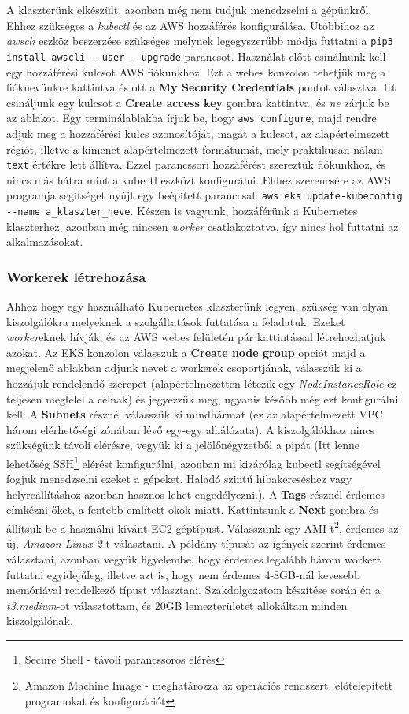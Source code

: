 A klaszterünk elkészült, azonban még nem tudjuk menedzselni a gépünkről. Ehhez szükséges a \textit{kubectl} és az AWS hozzáférés konfigurálása. Utóbbihoz az \textit{awscli} eszköz beszerzése szükséges melynek legegyszerűbb módja futtatni a \lstinline{pip3 install awscli --user --upgrade} parancsot. Használat előtt csinálnunk kell egy hozzáférési kulcsot AWS fiókunkhoz. Ezt a webes konzolon tehetjük meg a fióknevünkre kattintva és ott a \textbf{My Security Credentials} pontot választva. Itt csináljunk egy kulcsot a \textbf{Create access key} gombra kattintva, és \textit{ne} zárjuk be az ablakot. Egy terminálablakba írjuk be, hogy \lstinline{aws configure}, majd rendre adjuk meg a hozzáférési kulcs azonosítóját, magát a kulcsot, az alapértelmezett régiót, illetve a kimenet alapértelmezett formátumát, mely praktikusan nálam \lstinline{text} értékre lett állítva. Ezzel parancssori hozzáférést szereztük fiókunkhoz, és nincs más hátra mint a kubectl eszközt konfigurálni. Ehhez szerencsére az AWS programja segítséget nyújt egy beépített paranccsal: \lstinline{aws eks update-kubeconfig --name a_klaszter_neve}. Készen is vagyunk, hozzáférünk a Kubernetes klaszterhez, azonban még nincsen \textit{worker} csatlakoztatva, így nincs hol futtatni az alkalmazásokat.
\subsubsection{Workerek létrehozása}
Ahhoz hogy egy használható Kubernetes klaszterünk legyen, szükség van olyan kiszolgálókra melyeknek a szolgáltatások futtatása a feladatuk. Ezeket \textit{worker}eknek hívják, és az AWS webes felületén pár kattintással létrehozhatjuk azokat. Az EKS konzolon válasszuk a \textbf{Create node group} opciót majd a megjelenő ablakban adjunk nevet a workerek csoportjának, válasszük ki a hozzájuk rendelendő szerepet (alapértelmezetten létezik egy \textit{NodeInstanceRole} ez teljesen megfelel a célnak) és jegyezzük meg, ugyanis később még ezt konfigurálni kell. A \textbf{Subnets} résznél válasszük ki mindhármat (ez az alapértelmezett VPC három elérhetőségi zónában lévő egy-egy alhálózata). A kiszolgálókhoz nincs szükségünk távoli elérésre, vegyük ki a jelölőnégyzetből a pipát (Itt lenne lehetőség SSH\footnote{Secure Shell - távoli parancssoros elérés} elérést konfigurálni, azonban mi kizárólag kubectl segítségével fogjuk menedzselni ezeket a gépeket. Haladó szintű hibakereséshez vagy helyreállításhoz azonban hasznos lehet engedélyezni.). A \textbf{Tags} résznél érdemes címkézni őket, a fentebb említett okok miatt. Kattintsunk a \textbf{Next} gombra és állítsuk be a használni kívánt EC2 géptípust. Válasszunk egy AMI-t\footnote{Amazon Machine Image - meghatározza az operációs rendszert, előtelepített programokat és konfigurációt}, érdemes az új, \textit{Amazon Linux 2}-t választani. A példány típusát az igények szerint érdemes választani, azonban vegyük figyelembe, hogy érdemes legalább három workert futtatni egyidejűleg, illetve azt is, hogy nem érdemes 4-8GB-nál kevesebb memóriával rendelkező típust választani. Szakdolgozatom készítése során én a \textit{t3.medium}-ot választottam, és 20GB lemezterületet allokáltam minden kiszolgálónak.

